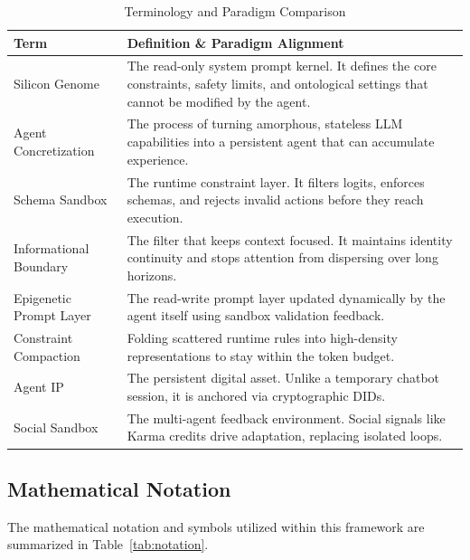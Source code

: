 \documentclass[10pt,journal,compsoc]{IEEEtran}
\begin{document}
\begin{table}[t]
\centering
\caption{Terminology and Paradigm Comparison}
\label{tab:comparison}
\begin{tabular}{lp{12cm}}
\toprule
\textbf{Term} & \textbf{Definition \& Paradigm Alignment} \\
\midrule
Silicon Genome & The read-only system prompt kernel. It defines the core constraints, safety limits, and ontological settings that cannot be modified by the agent. \\
\midrule
Agent Concretization & The process of turning amorphous, stateless LLM capabilities into a persistent agent that can accumulate experience. \\
\midrule
Schema Sandbox & The runtime constraint layer. It filters logits, enforces schemas, and rejects invalid actions before they reach execution. \\
\midrule
Informational Boundary & The filter that keeps context focused. It maintains identity continuity and stops attention from dispersing over long horizons. \\
\midrule
Epigenetic Prompt Layer & The read-write prompt layer updated dynamically by the agent itself using sandbox validation feedback. \\
\midrule
Constraint Compaction & Folding scattered runtime rules into high-density representations to stay within the token budget. \\
\midrule
Agent IP & The persistent digital asset. Unlike a temporary chatbot session, it is anchored via cryptographic DIDs. \\
\midrule
Social Sandbox & The multi-agent feedback environment. Social signals like Karma credits drive adaptation, replacing isolated loops. \\
\bottomrule
\end{tabular}
\end{table}

\subsection{Mathematical Notation}
The mathematical notation and symbols utilized within this framework are summarized in Table~\ref{tab:notation}.
\end{document}
